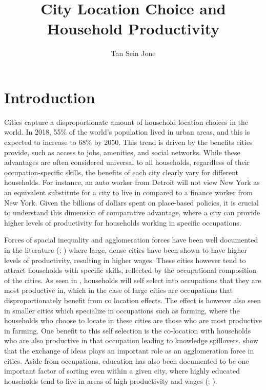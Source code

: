 \documentclass[10pt]{article}
\title{City Location Choice and Household Productivity}
\author{Tan Sein Jone}
\date{}
\begin{document}
\doublespacing
\maketitle

\section{Introduction}

Cities capture a disproportionate amount of household location choices in the world. In 2018, 55\% of the world's population lived in urban areas, and this is expected to increase to 68\% by 2050. This trend is driven by the benefits cities provide, such as access to jobs, amenities, and social networks. While these advantages are often considered universal to all households, regardless of their occupation-specific skills, the benefits of each city clearly vary for different households. For instance, an auto worker from Detroit will not view New York as an equivalent substitute for a city to live in compared to a finance worker from New York. Given the billions of dollars spent on place-based policies, it is crucial to understand this dimension of comparative advantage, where a city can provide higher levels of productivity for households working in specific occupations.

Forces of spacial inequality and agglomeration forces have been well documented in the literature (\cite{behrens2014}; \cite{br2015}) where large, dense cities have been shown to have higher levels of productivity, resulting in higher wages. These cities however tend to attract households with specific skills, reflected by the occupational composition of the cities. As seen in \cite{lagakos_waugh2013}, households will self select into occupations that they are most productive in, which in the case of large cities are occupations that disproportionately benefit from co location effects. The effect is however also seen in smaller cities which specialize in occupations such as farming, where the households who choose to locate in these cities are those who are most productive in farming. One benefit to this self selection is the co-location with households who are also productive in that occupation leading to knowledge spillovers. \cite{dandd} show that the exchange of ideas plays an important role as an agglomeration force in cities. Aside from occupations, education has also been documented to be one important factor of sorting even within a given city, where highly educated households tend to live in areas of high productivity and wages (\cite{diamond}; \cite{diamond2022}).
\end{document}
